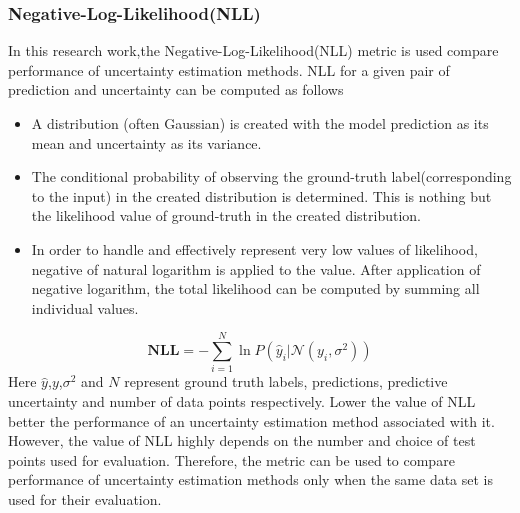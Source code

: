 \subsubsection{Negative-Log-Likelihood(NLL)}
In this research work,the Negative-Log-Likelihood(NLL) metric is used compare performance of uncertainty estimation methods. NLL for a given pair of prediction and uncertainty can be computed as follows
\begin{itemize}
	\item A distribution (often Gaussian) is created with the model prediction as its mean and uncertainty as its variance.
	\item The conditional probability of observing the ground-truth label(corresponding to the input) in the created distribution is determined. This is nothing but the likelihood value of ground-truth in the created distribution.
	\item  In order to handle and effectively represent very low values of likelihood, negative of natural logarithm is applied  to the value. After application of negative logarithm, the total likelihood can be computed by summing all individual values.
\end{itemize}
\begin{equation}
	\mathbf{NLL} = -\sum_{i=1}^{N}\ln P(\hat{y}_i|\mathcal{N}(y_i,\sigma^2)) 
\end{equation}
Here $\hat{y}$,$y$,$\sigma^2$ and $N$ represent ground truth labels, predictions, predictive uncertainty and number of data points respectively.
Lower the value of NLL better the performance of an uncertainty estimation method associated with it. However, the value of NLL highly depends on the number and choice of test points used for evaluation. Therefore, the metric can be used to compare performance of uncertainty estimation methods only when the same data set is used for their evaluation.
